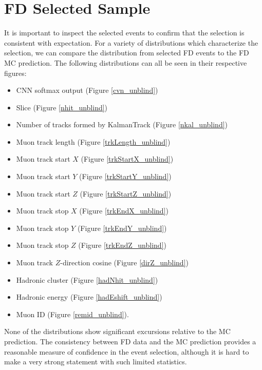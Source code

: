 \section{FD Selected Sample}
\label{fd_selection_section}

It is important to inspect the selected events to confirm that
the selection is consistent with expectation.
For a variety of distributions which characterize the selection,
we can compare the distribution from selected FD events
to the FD MC prediction.
The following distributions can all be seen in their respective figures:
\begin{itemize}
  \item CNN softmax output (Figure \ref{cvn_unblind})
  \item Slice \nhit (Figure \ref{nhit_unblind})
  \item Number of tracks formed by KalmanTrack (Figure \ref{nkal_unblind})
  \item Muon track length (Figure \ref{trkLength_unblind})
  \item Muon track start $X$ (Figure \ref{trkStartX_unblind})
  \item Muon track start $Y$ (Figure \ref{trkStartY_unblind})
  \item Muon track start $Z$ (Figure \ref{trkStartZ_unblind})
  \item Muon track stop $X$ (Figure \ref{trkEndX_unblind})
  \item Muon track stop $Y$ (Figure \ref{trkEndY_unblind})
  \item Muon track stop $Z$ (Figure \ref{trkEndZ_unblind})
  \item Muon track $Z$-direction cosine (Figure \ref{dirZ_unblind})
  \item Hadronic cluster \nhit (Figure \ref{hadNhit_unblind})
  \item Hadronic energy (Figure \ref{hadEshift_unblind})
  \item Muon ID (Figure \ref{remid_unblind}).
\end{itemize}
None of the distributions show significant excursions relative to the
MC prediction.
The consistency between FD data and the MC prediction provides
a reasonable measure of confidence in the event selection,
although it is hard to make a very strong statement
with such limited statistics.




